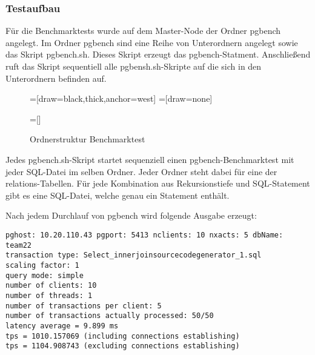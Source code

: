 \subsubsection{Testaufbau}
Für die Benchmarktests wurde auf dem Master-Node der Ordner pgbench angelegt. Im Ordner pgbench sind eine Reihe von Unterordnern angelegt sowie das Skript pgbench.sh. Dieses Skript erzeugt das pgbench-Statment. Anschließend ruft das Skript sequentiell alle pgbensh.sh-Skripte auf die sich in den Unterordnern befinden auf.
\begin{figure}[H]
=[draw=black,thick,anchor=west]
\usetikzlibrary{trees}
=[draw=none]
=[]
\caption{Ordnerstruktur Benchmarktest}
\end{figure}
Jedes pgbench.sh-Skript startet sequenziell einen pgbench-Benchmarktest mit jeder SQL-Datei im selben Ordner. Jeder Ordner steht dabei für eine der relations-Tabellen. Für jede Kombination aus Rekursionstiefe und SQL-Statement gibt es eine SQL-Datei, welche genau ein Statement enthält.

Nach jedem Durchlauf von pgbench wird folgende Ausgabe erzeugt:

\begin{lstlisting}[caption= Ausgabe pgbench]
pghost: 10.20.110.43 pgport: 5413 nclients: 10 nxacts: 5 dbName: team22
transaction type: Select_innerjoinsourcecodegenerator_1.sql
scaling factor: 1
query mode: simple
number of clients: 10
number of threads: 1
number of transactions per client: 5
number of transactions actually processed: 50/50
latency average = 9.899 ms
tps = 1010.157069 (including connections establishing)
tps = 1104.908743 (excluding connections establishing)
\end{lstlisting}

